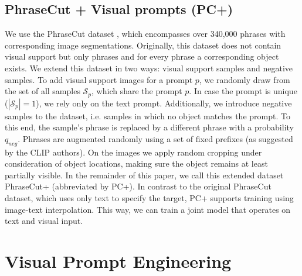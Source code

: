 \subsection{PhraseCut + Visual prompts (PC+)}

We use the PhraseCut dataset \cite{wu20phrasecut}, which encompasses over 340,000 phrases with corresponding image segmentations.
Originally, this dataset does not contain visual support but only phrases and for every phrase a corresponding object exists. We extend this dataset in two ways: visual support samples and negative samples. 
To add visual support images for a prompt $p$, we randomly draw from the set of all samples $\mathcal{S}_p$, which share the prompt $p$. In case the prompt is unique ($|\mathcal{S}_p| = 1$), we rely only on the text prompt. 
Additionally, we introduce negative samples to the dataset, i.e. samples in which no object matches the prompt. To this end, the sample's phrase is replaced by a different phrase with a probability $q_{neg}$.
Phrases are augmented randomly using a set of fixed prefixes (as suggested by the CLIP authors). On the images we apply random cropping under consideration of object locations, making sure the object remains at least partially visible.
In the remainder of this paper, we call this extended dataset PhraseCut+ (abbreviated by PC+). In contrast to the original PhraseCut dataset, which uses only text to specify the target, PC+ supports training using image-text interpolation. This way, we can train a joint model that operates on text and visual input.

\section{Visual Prompt Engineering}

\label{sec:prompt_engineering}

